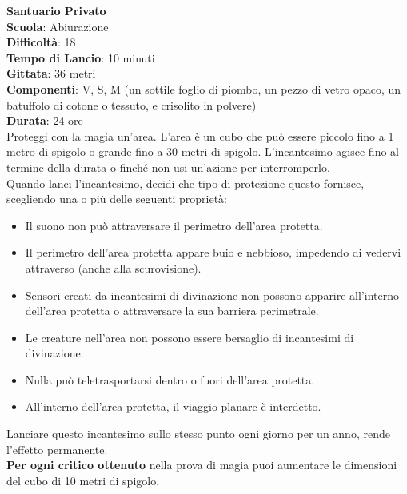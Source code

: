 \begin{multicols}{2}
\medskip\textbf{Santuario Privato}\\
\textbf{Scuola}: Abiurazione\\
\textbf{Difficoltà}: 18\\
\textbf{Tempo di Lancio}: 10 minuti\\
\textbf{Gittata}: 36 metri\\
\textbf{Componenti}: V, S, M (un sottile foglio di piombo, un pezzo di vetro opaco, un batuffolo di cotone o tessuto, e crisolito in polvere)\\
\textbf{Durata}: 24 ore \\
Proteggi con la magia un'area. L'area è un cubo che può essere piccolo fino a 1 metro di spigolo o grande fino a 30 metri di spigolo. L'incantesimo agisce fino al termine della durata o finché non usi un'azione per interromperlo.\\
Quando lanci l'incantesimo, decidi che tipo di protezione questo fornisce, scegliendo una o più delle seguenti proprietà:\\
\medskip
\begin{itemize}
\item
Il suono non può attraversare il perimetro dell'area protetta.
\item
Il perimetro dell'area protetta appare buio e nebbioso, impedendo di vedervi attraverso (anche
alla scurovisione).
\item
Sensori creati da incantesimi di divinazione non possono apparire all'interno dell'area protetta o attraversare la sua barriera perimetrale.
\item
Le creature nell'area non possono essere bersaglio di incantesimi di divinazione.
\item
Nulla può teletrasportarsi dentro o fuori dell'area protetta.
\item
All'interno dell'area protetta, il viaggio planare è interdetto.
\end{itemize}
Lanciare questo incantesimo sullo stesso punto ogni giorno per un anno, rende l'effetto permanente.\\
\textbf{Per ogni critico ottenuto} nella prova di magia puoi aumentare le dimensioni del cubo di 10 metri di spigolo.


\end{multicols}

